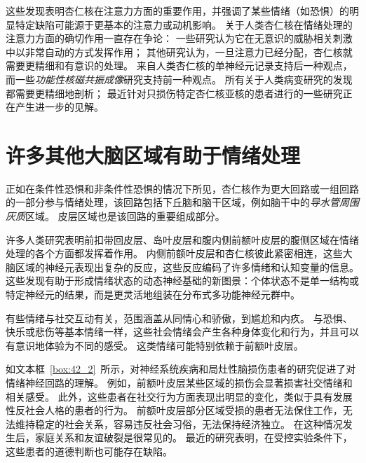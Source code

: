 这些发现表明杏仁核在注意力方面的重要作用，并强调了某些情绪（如恐惧）的明显特定缺陷可能源于更基本的注意力或动机影响。
关于人类杏仁核在情绪处理的注意力方面的确切作用一直存在争论：
一些研究认为它在无意识的威胁相关刺激中以非常自动的方式发挥作用；
其他研究认为，一旦注意力已经分配，杏仁核就需要更精细和有意识的处理。
来自人类杏仁核的单神经元记录支持后一种观点，而一些\textit{功能性核磁共振成像}研究支持前一种观点。
所有关于人类病变研究的发现都需要更精细地剖析；
最近针对只损伤特定杏仁核亚核的患者进行的一些研究正在产生进一步的见解。



\section{许多其他大脑区域有助于情绪处理}

正如在条件性恐惧和非条件性恐惧的情况下所见，杏仁核作为更大回路或一组回路的一部分参与情绪处理，该回路包括下丘脑和脑干区域，例如脑干中的\textit{导水管周围灰质}区域。
皮层区域也是该回路的重要组成部分。


许多人类研究表明前扣带回皮层、岛叶皮层和腹内侧前额叶皮层的腹侧区域在情绪处理的各个方面都发挥着作用。
内侧前额叶皮层和杏仁核彼此紧密相连，这些大脑区域的神经元表现出复杂的反应，这些反应编码了许多情绪和认知变量的信息。
这些发现有助于形成情绪状态的动态神经基础的新图景：个体状态不是单一结构或特定神经元的结果，而是更灵活地组装在分布式多功能神经元群中。


有些情绪与社交互动有关，范围涵盖从同情心和骄傲，到尴尬和内疚。
与恐惧、快乐或悲伤等基本情绪一样，这些社会情绪会产生各种身体变化和行为，并且可以有意识地体验为不同的感受。
这类情绪可能特别依赖于前额叶皮层。


如文本框~\ref{box:42_2}~所示，对神经系统疾病和局灶性脑损伤患者的研究促进了对情绪神经回路的理解。
例如，前额叶皮层某些区域的损伤会显著损害社交情绪和相关感受。
此外，这些患者在社交行为方面表现出明显的变化，类似于具有发展性反社会人格的患者的行为。
前额叶皮层部分区域受损的患者无法保住工作，无法维持稳定的社会关系，容易违反社会习俗，无法保持经济独立。
在这种情况发生后，家庭关系和友谊破裂是很常见的。
最近的研究表明，在受控实验条件下，这些患者的道德判断也可能存在缺陷。


